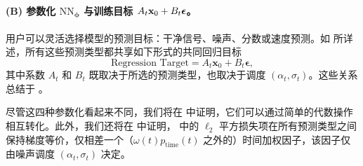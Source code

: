 \paragraph{(B) 参数化 $\mathrm{NN}_{\bm{\phi}}$ 与训练目标 $A_t {\mathbf{x}}_0 + B_t \bm{\epsilon}$。}  用户可以灵活选择模型的预测目标：干净信号、噪声、分数或速度预测。如  所详述，所有这些预测类型都共享如下形式的共同回归目标
\[
    \text{Regression Target} = A_t \mathbf{x}_0 + B_t \bm{\epsilon},
\]
其中系数 $A_t$ 和 $B_t$ 既取决于所选的预测类型，也取决于调度 $(\alpha_t, \sigma_t)$。这些关系总结于 。

尽管这四种参数化看起来不同，我们将在  中证明，它们可以通过简单的代数操作相互转化。此外，我们还将在  中证明， 中的 $\ell_2$ 平方损失项在所有预测类型之间保持梯度等价，仅相差一个（$\omega(t) p_{\mathrm{time}}(t)$ 之外的）时间加权因子，该因子仅由噪声调度 $(\alpha_t, \sigma_t)$ 决定。



\begin{table}[th]
  \caption{不同参数化之间关系的总结。
四种参数化在数学上相互等价，可以通过简单的代数变换相互转换。
}
  \small
  \centering
  \label{tb:A_t-B_t-parametrizations}
\end{table}



